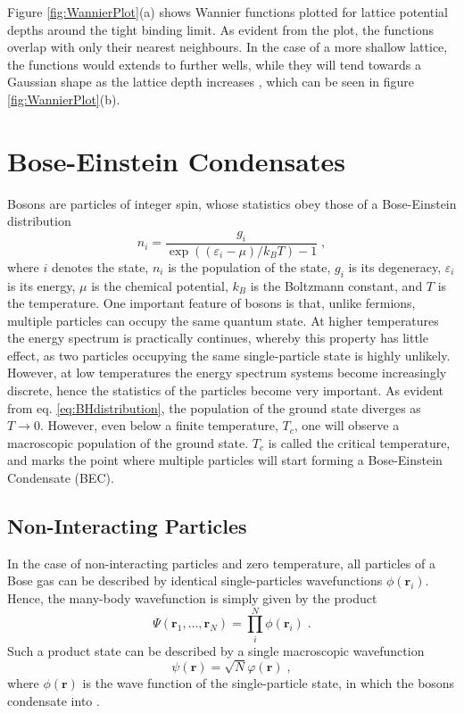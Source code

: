Figure \ref{fig:WannierPlot}(a) shows Wannier functions plotted for lattice potential depths around the tight binding limit. As evident from the plot, the functions overlap with only their nearest neighbours. In the case of a more shallow lattice, the functions would extends to further wells, while they will tend towards a Gaussian shape as the lattice depth increases \cite{greiner}, which can be seen in figure \ref{fig:WannierPlot}(b).



\section{Bose-Einstein Condensates}

Bosons are particles of integer spin, whose statistics obey those of a Bose-Einstein distribution
\begin{equation}
	n_i = \frac{g_i}{\exp \left( \left( \varepsilon_i -\mu \right) / k_B T \right) - 1} \; , \label{eq:BHdistribution}
\end{equation} 
where $i$ denotes the state, $n_i$ is the population of the state, $g_i$ is its degeneracy, $\varepsilon_i$ is its energy, $\mu$ is the chemical potential, $k_B$ is the Boltzmann constant, and $T$ is the temperature. One important feature of bosons is that, unlike fermions, multiple particles can occupy the same quantum state. At higher temperatures the energy spectrum is practically continues, whereby this property has little effect, as two particles occupying the same single-particle state is highly unlikely. However, at low temperatures the energy spectrum systems become increasingly discrete, hence the statistics of the particles become very important. As evident from eq. \eqref{eq:BHdistribution}, the population of the ground state diverges as $T \to 0$. However, even below a finite temperature, $T_c$, one will observe a macroscopic population of the ground state. $T_c$ is called the critical temperature, and marks the point where multiple particles will start forming a Bose-Einstein Condensate (BEC). \cite{pethick2002bose}

\subsection{Non-Interacting Particles}
In the case of non-interacting particles and zero temperature, all particles of a Bose gas can be described by identical single-particles wavefunctions $\phi (\boldsymbol{r}_i)$. Hence, the many-body wavefunction is simply given by the product 
\begin{equation}
	\Psi (\boldsymbol{r}_1 , \ldots , \boldsymbol{r}_N) = \prod_{i}^{N} \phi (\boldsymbol{r}_i) \; .
\end{equation}
Such a product state can be described by a single macroscopic wavefunction
\begin{equation}
	\psi (\boldsymbol{r}) = \sqrt{N} \varphi (\boldsymbol{r}) \; , \label{eq:psi_NIBEC}
\end{equation}
where $\phi (\boldsymbol{r})$ is the wave function of the single-particle state, in which the bosons condensate into \cite{PenroseOnsager}.

